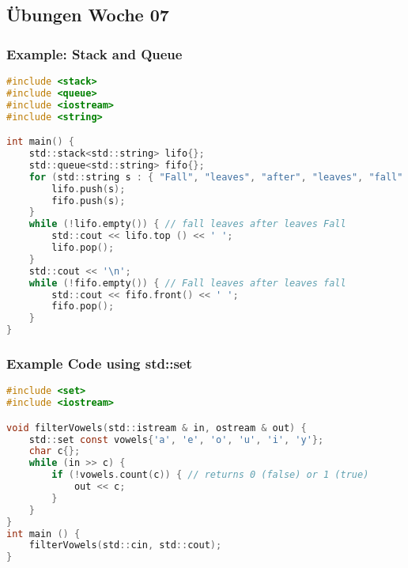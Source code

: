 
\subsection{Übungen Woche 07}
\subsubsection{Example: Stack and Queue}
\begin{lstlisting}[style=frame, style= linenumbers, language=C]
#include <stack>
#include <queue>
#include <iostream>
#include <string>

int main() {
    std::stack<std::string> lifo{};
    std::queue<std::string> fifo{};
    for (std::string s : { "Fall", "leaves", "after", "leaves", "fall" }) {
        lifo.push(s);
        fifo.push(s);
    }
    while (!lifo.empty()) { // fall leaves after leaves Fall
        std::cout << lifo.top () << ' ';
        lifo.pop();
    }
    std::cout << '\n';
    while (!fifo.empty()) { // Fall leaves after leaves fall
        std::cout << fifo.front() << ' ';
        fifo.pop();
    }
}
\end{lstlisting}

\subsubsection{Example Code using std::set}
\begin{lstlisting}[style=frame, style= linenumbers, language=C]
#include <set>
#include <iostream>

void filterVowels(std::istream & in, ostream & out) {
    std::set const vowels{'a', 'e', 'o', 'u', 'i', 'y'};
    char c{};
    while (in >> c) {
        if (!vowels.count(c)) { // returns 0 (false) or 1 (true)
            out << c;
        }
    }
}
int main () {
    filterVowels(std::cin, std::cout);
}
\end{lstlisting}

